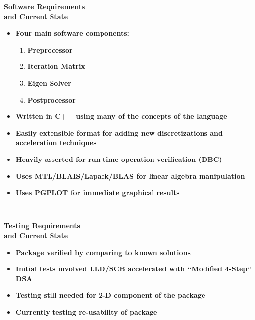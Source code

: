 {\Huge
\begin{center}
{\bf Software Requirements}\\
{\bf and Current State}
\end{center}
}
\vskip0.5in
{\Huge
\begin{itemize}
 \item {\bf Four main software components:}
  {\Large
  \begin{enumerate}
   \item {\bf Preprocessor}
   \item {\bf Iteration Matrix}
   \item {\bf Eigen Solver}
   \item {\bf Postprocessor}
  \end{enumerate}
  }
 \item {\bf Written in C++ using many of the concepts of the
            language}
 \item {\bf Easily extensible format for adding new discretizations and 
            acceleration techniques}
 \item {\bf Heavily asserted for run time operation verification (DBC)}
 \item {\bf Uses MTL/BLAIS/Lapack/BLAS for linear algebra manipulation}
 \item {\bf Uses PGPLOT for immediate graphical results}
\end{itemize}
}
\vskip2.0in

\baselineskip=0.29in
\newpage 
\mbox{ }
\vskip0.5in 

\noindent

{\Huge
\begin{center}
{\bf Testing Requirements}\\
{\bf and Current State}
\end{center}
}
\vskip0.5in
{\Huge
\begin{itemize}
\item {\bf Package verified by comparing to known solutions}
\item {\bf Initial tests involved LLD/SCB accelerated with ``Modified
           4-Step'' DSA}
\item {\bf Testing still needed for 2-D component of the package}
\item {\bf Currently testing re-usability of package}
\end{itemize}
}

\vskip2.0in